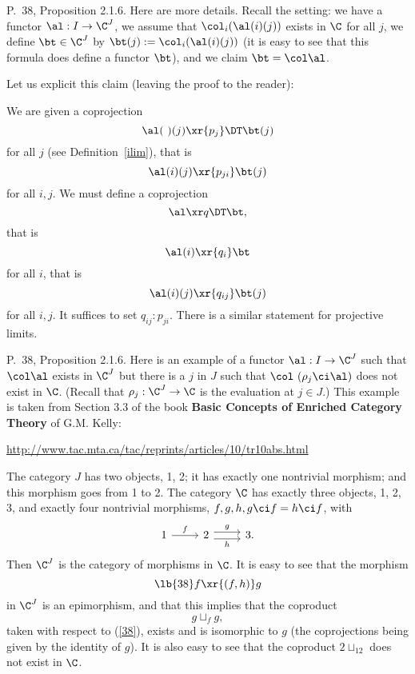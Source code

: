 \documentclass[12pt]{article}
\theoremstyle{remark}
\theoremstyle{definition}
\begin{document}
\begin{s}
P.~38, Proposition 2.1.6. Here are more details. Recall the setting: we have a functor $\al:I\to\C^J$, we assume that $\col_i(\al(i)(j))$ exists in $\C$ for all $j$, we define $\bt\in\C^J$ by $\bt(j):=\col_i(\al(i)(j))$ (it is easy to see that this formula does define a functor $\bt$), and we claim $\bt=\col\al$. 

Let us explicit this claim (leaving the proof to the reader):

We are given a coprojection
$$
\al(\ )(j)\xr{p_j}\DT\bt(j)
$$ 
for all $j$ (see Definition~\ref{ilim}), that is 
$$
\al(i)(j)\xr{p_{ji}}\bt(j)
$$ 
for all $i,j$. We must define a coprojection 
$$
\al\xr q\DT\bt,
$$ 
that is 
$$
\al(i)\xr{q_i}\bt
$$ 
for all $i$, that is 
$$
\al(i)(j)\xr{q_{ij}}\bt(j)
$$ 
for all $i,j$. It suffices to set $q_{ij}:p_{ji}$. There is a similar statement for projective limits.
\end{s}

%

\begin{s}
P.~38, Proposition 2.1.6. Here is an example of a functor $\al:I\to\C^J$ such that $\col\al$ exists in $\C^J$ but there is a $j$ in $J$ such that $\col\ (\rho_j\ci\al)$ does not exist in $\C$. (Recall that $\rho_j:\C^J\to\C$ is the evaluation at $j\in J$.) This example is taken from Section 3.3 of the book \textbf{Basic Concepts of Enriched Category Theory} of G.M. Kelly:%
%
\begin{center}\href{http://www.tac.mta.ca/tac/reprints/articles/10/tr10abs.html}{http://www.tac.mta.ca/tac/reprints/articles/10/tr10abs.html}
\end{center}

The category $J$ has two objects, 1, 2; it has exactly one nontrivial morphism; and this morphism goes from 1 to 2. The category $\C$ has exactly three objects, 1, 2, 3, and exactly four nontrivial morphisms, $f,g,h,g\ci f=h\ci f$, with 
$$
\begin{tikzcd}
1\ar{r}{f}&2\ar[yshift=.7ex]{r}{g}\ar[yshift=-.7ex]{r}[swap]{h}&3.
\end{tikzcd}
$$ 
Then $\C^J$ is the category of morphisms in $\C$. It is easy to see that the morphism 
%
\begin{equation}\lb{38}
f\xr{(f,h)}g 
\end{equation}
%
in $\C^J$ is an epimorphism, and that this implies that the coproduct 
$$
g\sqcup_fg,
$$ 
taken with respect to (\ref{38}), exists and is isomorphic to $g$ (the coprojections being given by the identity of $g$). It is also easy to see that the coproduct $2\sqcup_12$ does not exist in $\C$.
\end{s}
\end{document}
